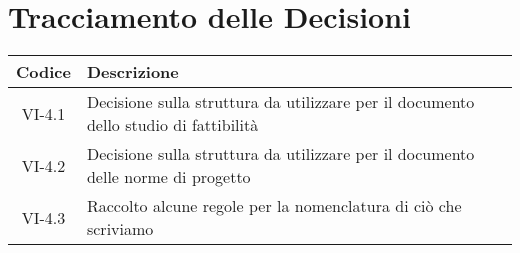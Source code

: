 \section*{Tracciamento delle Decisioni}

\begin{center}
	\begin{longtable}{|c|p{14.5cm}|}
	\hline
	\rowcolor{lighter-grayer}
	\textbf{Codice} & \textbf{Descrizione} \\
	\hline
	\endfirsthead

	\hline
	VI-4.1 & Decisione sulla struttura da utilizzare per il documento dello studio di fattibilità \\
	VI-4.2 & Decisione sulla struttura da utilizzare per il documento delle norme di progetto \\
	VI-4.3 & Raccolto alcune regole per la nomenclatura di ciò che scriviamo \\
	\hline
	
	\end{longtable}
\end{center}
